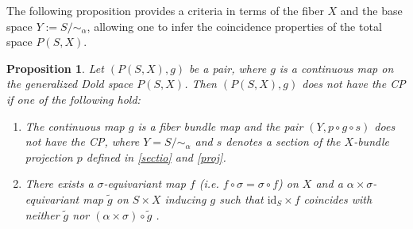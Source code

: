 \documentclass{amsart}
\newtheorem{proposition}[theorem]{Proposition}
\newcommand{\subsecref}[1]{Subsection~\ref{#1}}
\begin{document}
	
	 The following proposition provides a criteria in terms of the fiber $X$ and the base space $Y := S/\!\!\sim_\alpha$, allowing one to infer the coincidence properties of the total space $P(S,X)$.
	
	
	
	\begin{proposition}\label{necessary condition}
		Let $(P(S,X),g)$ be a pair, where $g$ is a continuous map on the generalized Dold space $P(S,X)$. Then $(P(S,X),g)$ does not have the CP if one of the following %
hold:
		\begin{enumerate}
			\item The continuous map $g$ is a fiber bundle map and the pair $(Y,p \circ g \circ s)$ does not %
have the CP, 
			where $Y = S/\!\!\sim_\alpha$ and $s$ denotes a section of the $X$-bundle projection $p$ defined in \eqref{sectio} %
and \eqref{proj}.
			
			\item  
			There exists a $\sigma$-equivariant map $f$ (i.e. $f\circ\sigma =\sigma\circ f$) on $X$ and a $\alpha \times \sigma$-equivariant map %
$\tilde g$ on $S\times X$ inducing $g$ such that
			$\mathrm{id}_S \times f$ coincides with neither $\tilde{g}$ nor
			$(\alpha \times \sigma) \circ \tilde{g}$%
.
		\end{enumerate}
		
		
		
	\end{proposition}
\end{document}
